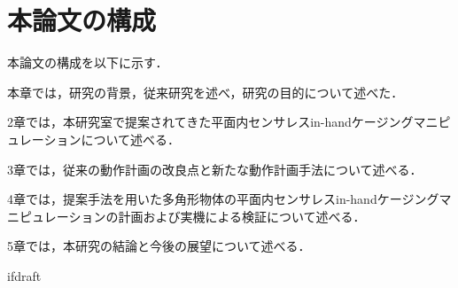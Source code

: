 \documentclass[a4paper,twoside,12pt,papersize, dvipdfmx]{iirthesis}
\begin{document}
\section{本論文の構成}\label{sec::intro::configuration}
本論文の構成を以下に示す．\par
本章では，研究の背景，従来研究を述べ，研究の目的について述べた．\par
2章では，本研究室で提案されてきた平面内センサレスin-handケージングマニピュレーションについて述べる．\par
3章では，従来の動作計画の改良点と新たな動作計画手法について述べる．\par
4章では，提案手法を用いた多角形物体の平面内センサレスin-handケージングマニピュレーションの計画および実機による検証について述べる．\par
5章では，本研究の結論と今後の展望について述べる．


\expandafter\ifx\csname ifdraft\endcsname\relax
    
\end{document}
